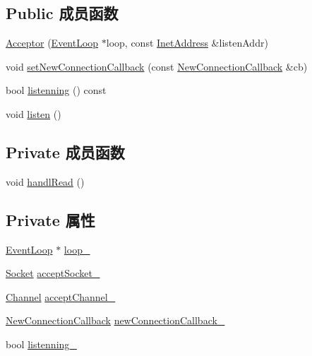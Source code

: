 \subsection*{Public 成员函数}
\begin{DoxyCompactItemize}
\item 
\hyperlink{classmuduo_1_1Acceptor_a034c2e4c8c39c67bcaa4a47a6fa906fd}{Acceptor} (\hyperlink{classmuduo_1_1EventLoop}{Event\+Loop} $\ast$loop, const \hyperlink{classmuduo_1_1InetAddress}{Inet\+Address} \&listen\+Addr)
\item 
void \hyperlink{classmuduo_1_1Acceptor_a30908d8d30b5333e6288a7430d598cb1}{set\+New\+Connection\+Callback} (const \hyperlink{classmuduo_1_1Acceptor_ad9da8988c47fddac6b0b91e01e154814}{New\+Connection\+Callback} \&cb)
\item 
bool \hyperlink{classmuduo_1_1Acceptor_a43301d614b7aaae820d7ddd7033984f5}{listenning} () const
\item 
void \hyperlink{classmuduo_1_1Acceptor_a458bbe4cf81360301586b2e62a7f9dd2}{listen} ()
\end{DoxyCompactItemize}
\subsection*{Private 成员函数}
\begin{DoxyCompactItemize}
\item 
void \hyperlink{classmuduo_1_1Acceptor_a3459892d34c1eb51b40a53b8062237ca}{handl\+Read} ()
\end{DoxyCompactItemize}
\subsection*{Private 属性}
\begin{DoxyCompactItemize}
\item 
\hyperlink{classmuduo_1_1EventLoop}{Event\+Loop} $\ast$ \hyperlink{classmuduo_1_1Acceptor_a19968f50018d32ac31f5cba0195591ac}{loop\+\_\+}
\item 
\hyperlink{classmuduo_1_1Socket}{Socket} \hyperlink{classmuduo_1_1Acceptor_a5b8432787de199c64a25108a26d4690d}{accept\+Socket\+\_\+}
\item 
\hyperlink{classmuduo_1_1Channel}{Channel} \hyperlink{classmuduo_1_1Acceptor_a32c277ec09ca9c780ddc51b21278c317}{accept\+Channel\+\_\+}
\item 
\hyperlink{classmuduo_1_1Acceptor_ad9da8988c47fddac6b0b91e01e154814}{New\+Connection\+Callback} \hyperlink{classmuduo_1_1Acceptor_a315d8356d0420fe5a89dc67f49c82617}{new\+Connection\+Callback\+\_\+}
\item 
bool \hyperlink{classmuduo_1_1Acceptor_af4e1fb2da4efe5a7bcfff6c2434f966d}{listenning\+\_\+}
\end{DoxyCompactItemize}


